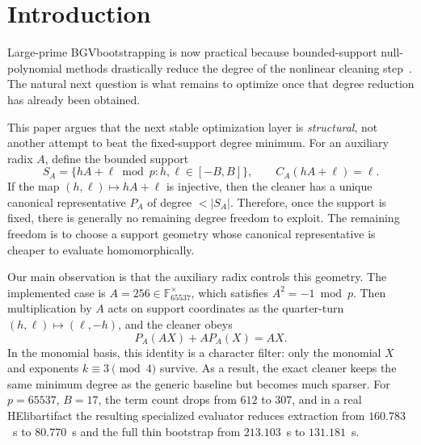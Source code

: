 \documentclass[a4paper,runningheads]{llncs}
\newcommand{\HElib}{\textsf{HElib}}
\newcommand{\BGV}{\textsf{BGV}}
\begin{document}
\begin{abstract}
\end{abstract}

\section{Introduction}
\label{sec:intro}

Large-prime \BGV bootstrapping is now practical because bounded-support null-polynomial methods drastically reduce the degree of the nonlinear cleaning step~\cite{ma_large_p}. The natural next question is what remains to optimize once that degree reduction has already been obtained.

This paper argues that the next stable optimization layer is \emph{structural}, not another attempt to beat the fixed-support degree minimum. For an auxiliary radix $A$, define the bounded support
\[
  S_A=\{hA+\ell\bmod p : h,\ell\in[-B,B]\},
  \qquad
  C_A(hA+\ell)=\ell.
\]
If the map $(h,\ell)\mapsto hA+\ell$ is injective, then the cleaner has a unique canonical representative $P_A$ of degree $<|S_A|$. Therefore, once the support is fixed, there is generally no remaining degree freedom to exploit. The remaining freedom is to choose a support geometry whose canonical representative is cheaper to evaluate homomorphically.

Our main observation is that the auxiliary radix controls this geometry. The implemented case is $A=256\in\mathbb{F}_{65537}^\times$, which satisfies $A^2=-1\bmod p$. Then multiplication by $A$ acts on support coordinates as the quarter-turn $(h,\ell)\mapsto(\ell,-h)$, and the cleaner obeys
\[
  P_A(AX)+AP_A(X)=AX.
\]
In the monomial basis, this identity is a character filter: only the monomial $X$ and exponents $k\equiv3\pmod4$ survive. As a result, the exact cleaner keeps the same minimum degree as the generic baseline but becomes much sparser. For $p=65537$, $B=17$, the term count drops from $612$ to $307$, and in a real \HElib artifact the resulting specialized evaluator reduces extraction from $160.783$~s to $80.770$~s and the full thin bootstrap from $213.103$~s to $131.181$~s.
\end{document}
